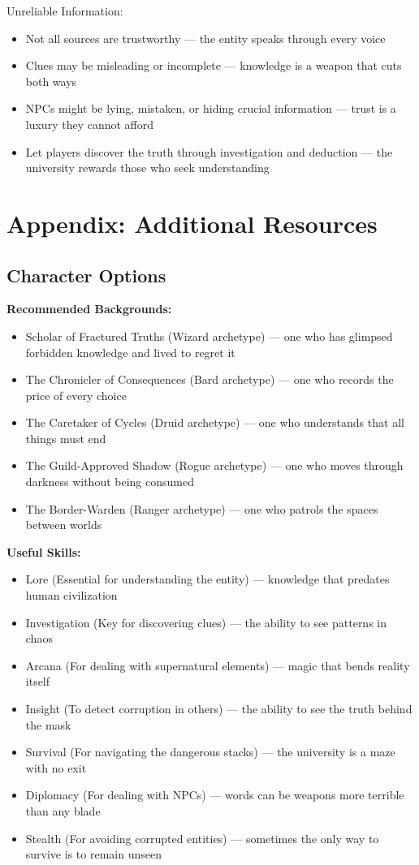 \documentclass[11pt]{article}
\begin{document}
Unreliable Information:
\begin{itemize}
\item Not all sources are trustworthy — the entity speaks through every voice
\item Clues may be misleading or incomplete — knowledge is a weapon that cuts both ways
\item NPCs might be lying, mistaken, or hiding crucial information — trust is a luxury they cannot afford
\item Let players discover the truth through investigation and deduction — the university rewards those who seek understanding
\end{itemize}

\section{Appendix: Additional Resources}

\subsection{Character Options}

\textbf{Recommended Backgrounds:}
\begin{itemize}
\item Scholar of Fractured Truths (Wizard archetype) — one who has glimpsed forbidden knowledge and lived to regret it
\item The Chronicler of Consequences (Bard archetype) — one who records the price of every choice
\item The Caretaker of Cycles (Druid archetype) — one who understands that all things must end
\item The Guild-Approved Shadow (Rogue archetype) — one who moves through darkness without being consumed
\item The Border-Warden (Ranger archetype) — one who patrols the spaces between worlds
\end{itemize}

\textbf{Useful Skills:}
\begin{itemize}
\item Lore (Essential for understanding the entity) — knowledge that predates human civilization
\item Investigation (Key for discovering clues) — the ability to see patterns in chaos
\item Arcana (For dealing with supernatural elements) — magic that bends reality itself
\item Insight (To detect corruption in others) — the ability to see the truth behind the mask
\item Survival (For navigating the dangerous stacks) — the university is a maze with no exit
\item Diplomacy (For dealing with NPCs) — words can be weapons more terrible than any blade
\item Stealth (For avoiding corrupted entities) — sometimes the only way to survive is to remain unseen
\end{itemize}
\end{document}
